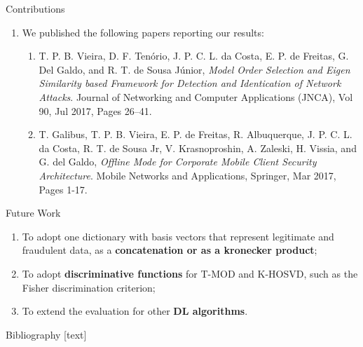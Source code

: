 \documentclass[newPxFont, numfooter, sectionpages]{beamer}
\begin{document}
\begin{frame}[c]{Contributions}
	\begin{enumerate}
		\item We published the following papers reporting our results:
		\begin{enumerate}
			\item T. P. B. Vieira, D. F. Ten\'orio, J. P. C. L. da Costa, E. P. de Freitas, G. Del Galdo, and R. T. de Sousa J\'unior, \textit{Model Order Selection and Eigen Similarity based Framework for Detection and Identication of Network Attacks}. Journal of Networking and Computer Applications (JNCA), Vol 90, Jul 2017, Pages 26–41.
			\item T. Galibus, T. P. B. Vieira, E. P. de Freitas, R. Albuquerque, J. P. C. L. da Costa, R. T. de Sousa Jr, V. Krasnoproshin, A. Zaleski, H. Vissia, and G. del Galdo, \textit{Offline Mode for Corporate Mobile Client Security Architecture}. Mobile Networks and Applications, Springer, Mar 2017, Pages 1-17.
		\end{enumerate}
	\end{enumerate}
\end{frame}
\begin{frame}[c]{Future Work}
	\begin{enumerate}
		\item To adopt one dictionary with basis vectors that represent legitimate and fraudulent data, as a \textbf{concatenation or as a kronecker product};
		\item To adopt \textbf{discriminative functions} for T-MOD and K-HOSVD, such as the Fisher discrimination criterion;
		\item To extend the evaluation for other \textbf{DL algorithms}.
	\end{enumerate}
\end{frame}

\begin{frame}{Bibliography}
	[text]
	\printbibliography
\end{frame}
\end{document}
